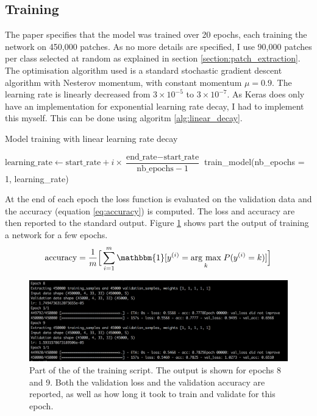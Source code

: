 \documentclass[12pt,a4paper,twoside,openright]{report}
\newcommand{\argmax}[1]{\underset{#1}{\operatorname{arg}\,\operatorname{max}}\;} %
\begin{document}
\subsection{Training}
The paper specifies that the model was trained over 20 epochs, each training the network on 450,000 patches. As no more details are specified, I use 90,000 patches per class selected at random as explained in section \ref{section:patch_extraction}. The optimisation algorithm used is a standard stochastic gradient descent algorithm with Nesterov momentum, with constant momentum $\mu = 0.9$. The learning rate is linearly decreased from $3 \times 10^{-5}$ to $3 \times 10^{-7}$. As Keras does only have an implementation for exponential learning rate decay, I had to implement this myself. This can be done using algoritm \ref{alg:linear_decay}.

\begin{algorithm}
\caption{Model training with linear learning rate decay}
\label{alg:linear_decay}
\begin{algorithmic}[1]
	\State $\text{learning\_rate} \gets \text{start\_rate} + i \times \dfrac{\text{end\_rate} - \text{start\_rate} }{ \text{nb\_epochs} - 1 }$
	\State train\_model(nb\_epochs = 1, learning\_rate)
\EndFor
\end{algorithmic}
\end{algorithm}

At the end of each epoch the loss function is evaluated on the validation data and the accuracy (equation \ref{eq:accuracy}) is computed. The loss and accuracy are then reported to the standard output. Figure \ref{fig:training_output} shows part the output of training a network for a few epochs.
\begin{equation}
	\label{eq:accuracy}
		\text{accuracy} = 
	\frac{1}{m}\Big[\sum_{i=1}^m\mathbbm{1}[y^{(i)} = \argmax{k}P(y^{(i)}=k)]\Big]
\end{equation}
\begin{figure}
	\centering
	\includegraphics[width=\textwidth]{training_output}
	\caption[Part of the output of the training script]{Part of the of the training script. The output is shown for epochs 8 and 9. Both the validation loss and the validation accuracy are reported, as well as how long it took to train and validate for this epoch.}
	\label{fig:training_output}
\end{figure}
\end{document}
